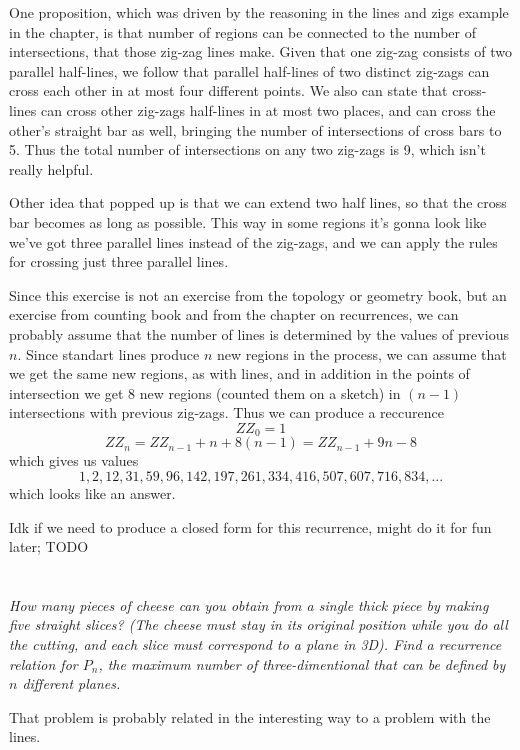 \documentclass[11pt,oneside,titlepage]{book}
\begin{document}
One proposition, which was driven by the reasoning in the lines and zigs example in the chapter,
is that number of regions can be connected to the
number of intersections, that those zig-zag lines make.
Given that one zig-zag consists of two parallel half-lines, we follow that parallel half-lines
of two distinct zig-zags can cross each other in at most four different points. We also
can state that cross-lines can cross other zig-zags half-lines in at most two places, and
can cross the other's straight bar as well, bringing the number of intersections of cross bars
to 5. Thus the total number of intersections on any two zig-zags is 9, which isn't really
helpful.

Other idea that popped up is that we can extend two half lines, so that the cross bar becomes
as long as possible. This way in some regions it's gonna look like we've got three parallel
lines instead of the zig-zags, and we can apply the rules for crossing just three parallel lines.

Since this exercise is not an exercise from the topology or geometry book, but an exercise from
counting book and from the chapter on recurrences, we can probably assume that
the number of lines is determined by the values of previous $n$. Since standart lines
produce $n$ new regions in the process, we can  assume that we get the same new regions, as
with lines, and in addition in the points of intersection we get 8 new regions (counted them on
a sketch) in
$(n - 1)$ intersections with previous zig-zags. Thus we can produce a reccurence
$$ZZ_0 = 1$$
$$ZZ_n = ZZ_{n - 1} + n + 8(n - 1) = ZZ_{n - 1} + 9n - 8$$
which gives us values
$$1, 2, 12, 31, 59, 96, 142, 197, 261, 334, 416, 507, 607, 716, 834, ...$$
which looks like an answer.

Idk if we need to produce a closed form for this recurrence, might do it for fun later; TODO

\section{}

\textit{How many pieces of cheese can you obtain from a single thick piece by making five
  straight slices? (The cheese must stay in its original position while you do all the cutting, and
  each slice must correspond to a plane in 3D). Find a recurrence relation for $P_n$, the
  maximum number of three-dimentional that can be defined by $n$ different planes.}

That problem is probably related in the interesting way to a problem with the lines.
\end{document}
